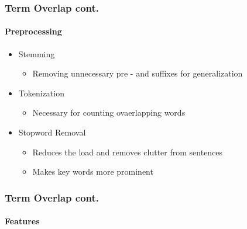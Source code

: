 \documentclass[english,handout]{mlutalk}
\begin{document}
\begin{frame}
  \frametitle{Term Overlap cont.}
  \framesubtitle{Preprocessing}
    \begin{itemize}
      \item Stemming 
        \begin{itemize}
          \item Removing unnecessary pre - and suffixes for generalization
        \end{itemize}
      \item Tokenization
        \begin{itemize}
          \item Necessary for counting ovaerlapping words
        \end{itemize}
      \item Stopword Removal
        \begin{itemize}
          \item Reduces the load and removes clutter from sentences
          \item Makes key words more prominent
        \end{itemize}
    \end{itemize}
\end{frame}

\begin{frame}
  \frametitle{Term Overlap cont.}
  \framesubtitle{Features}
    
    
\end{frame}
\end{document}
